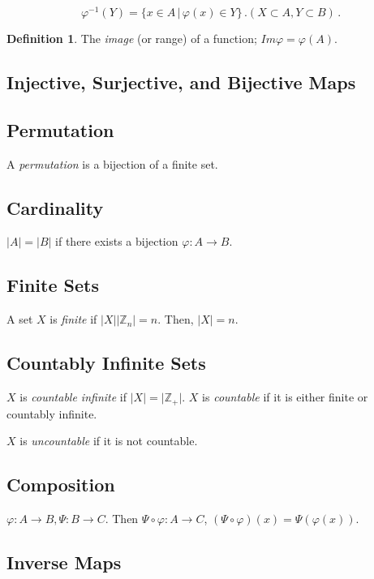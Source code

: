 \documentclass[12pt]{article}
\newcommand{\abs}[1]{\lvert#1\rvert}
\theoremstyle{definition}
\newtheorem{defn}[thm]{Definition}
\def\ZZ{\mathbb{Z}}
\begin{document}
$$\varphi^{-1}(Y) = \{x \in A \, | \, \varphi(x) \in Y\}\, . (X \subset A, Y \subset B)\, .$$

\begin{defn}\label{def0-0}
The \emph{image} (or range) of a function; $Im{\varphi} = \varphi(A)$.
\end{defn}

\subsection{Injective, Surjective, and Bijective Maps}

\subsection{Permutation}

A \emph{permutation} is a bijection of a finite set. 

\subsection{Cardinality}

$\abs{A} = \abs{B}$ if there exists a bijection $\varphi : A \to B$.

\subsection{Finite Sets}

A set $X$ is \emph{finite} if $\abs{X} \abs{\ZZ_n} = n$. Then, $\abs{X} = n$. 

\subsection{Countably Infinite Sets}

$X$ is \emph{countable infinite} if $\abs{X} = \abs{\ZZ_+}$. $X$ is \emph{countable} if it is either finite or countably infinite.

$X$ is \emph{uncountable} if it is not countable.

\subsection{Composition}

$\varphi : A \to B, \Psi : B \to C$. Then $\Psi \circ \varphi : A \to C$, $(\Psi \circ \varphi)(x) = \Psi(\varphi(x))$.

\subsection{Inverse Maps}
\end{document}
